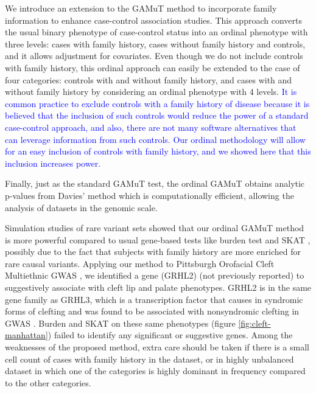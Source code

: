 \documentclass[]{article}
\begin{document}
We introduce an extension to the GAMuT method \citep{Broadaway2016} to
incorporate family information to enhance case-control association
studies. This approach converts the usual binary phenotype of
case-control status into an ordinal phenotype with three levels: cases
with family history, cases without family history and controls, and it
allows adjustment for covariates. Even though we do not include controls
with family history, this ordinal approach can easily be extended to the
case of four categories: controls with and without family history, and
cases with and without family history by considering an ordinal
phenotype with 4 levels.
\textcolor{blue}{It is common practice to exclude controls with a family history of disease because it is believed that the inclusion of such controls would reduce the power of a standard case-control approach, and also, there are not many software alternatives that can leverage information from such controls. Our ordinal methodology will allow for an easy inclusion of controls with family history, and we showed here that this inclusion increases power.}

Finally, just as the standard GAMuT test, the ordinal GAMuT obtains
analytic p-values from Davies' method \citep{Davies1980} which is
computationally efficient, allowing the analysis of datasets in the
genomic scale.

Simulation studies of rare variant sets showed that our ordinal GAMuT
method is more powerful compared to usual gene-based tests like burden
test \citep{Li2008, Madsen2009} and SKAT \citep{Wu2011}, possibly due to
the fact that subjects with family history are more enriched for rare
causal variants. Applying our method to Pittsburgh Orofacial Cleft
Multiethnic GWAS \citep{Leslie2016, Leslie2016b}, we identified a gene
(GRHL2) (not previously reported) to suggestively associate with cleft
lip and palate phenotypes. GRHL2 is in the same gene family as GRHL3,
which is a transcription factor that causes in syndromic forms of
clefting and was found to be associated with nonsyndromic clefting in
GWAS \citep{Leslie2016, Leslie2016b, Carpinelli2017, PeyrardJanvid2014}.
Burden and SKAT on these same phenotypes (figure
\ref{fig:cleft-manhattan}) failed to identify any significant or
suggestive genes. Among the weaknesses of the proposed method, extra
care should be taken if there is a small cell count of cases with family
history in the dataset, or in highly unbalanced dataset in which one of
the categories is highly dominant in frequency compared to the other
categories.
\end{document}
